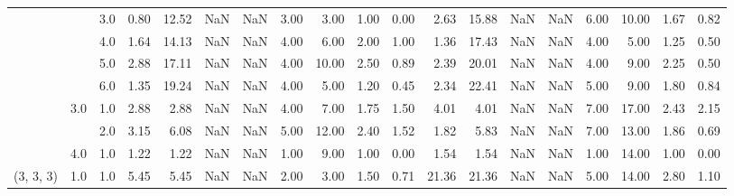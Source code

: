 \begin{tabular}{lllrrrrrrrrrrrrrrrr}
          &     & 3.0  &      0.80 &      12.52 &               NaN &                NaN &  3.00 &   3.00 &             1.00 &                         0.00 &      2.63 &      15.88 &               NaN &                NaN &  6.00 &  10.00 &             1.67 &                         0.82 \\
          &     & 4.0  &      1.64 &      14.13 &               NaN &                NaN &  4.00 &   6.00 &             2.00 &                         1.00 &      1.36 &      17.43 &               NaN &                NaN &  4.00 &   5.00 &             1.25 &                         0.50 \\
          &     & 5.0  &      2.88 &      17.11 &               NaN &                NaN &  4.00 &  10.00 &             2.50 &                         0.89 &      2.39 &      20.01 &               NaN &                NaN &  4.00 &   9.00 &             2.25 &                         0.50 \\
          &     & 6.0  &      1.35 &      19.24 &               NaN &                NaN &  4.00 &   5.00 &             1.20 &                         0.45 &      2.34 &      22.41 &               NaN &                NaN &  5.00 &   9.00 &             1.80 &                         0.84 \\
          & 3.0 & 1.0  &      2.88 &       2.88 &               NaN &                NaN &  4.00 &   7.00 &             1.75 &                         1.50 &      4.01 &       4.01 &               NaN &                NaN &  7.00 &  17.00 &             2.43 &                         2.15 \\
          &     & 2.0  &      3.15 &       6.08 &               NaN &                NaN &  5.00 &  12.00 &             2.40 &                         1.52 &      1.82 &       5.83 &               NaN &                NaN &  7.00 &  13.00 &             1.86 &                         0.69 \\
          & 4.0 & 1.0  &      1.22 &       1.22 &               NaN &                NaN &  1.00 &   9.00 &             1.00 &                         0.00 &      1.54 &       1.54 &               NaN &                NaN &  1.00 &  14.00 &             1.00 &                         0.00 \\
(3, 3, 3) & 1.0 & 1.0  &      5.45 &       5.45 &               NaN &                NaN &  2.00 &   3.00 &             1.50 &                         0.71 &     21.36 &      21.36 &               NaN &                NaN &  5.00 &  14.00 &             2.80 &                         1.10 \\

\end{tabular}

